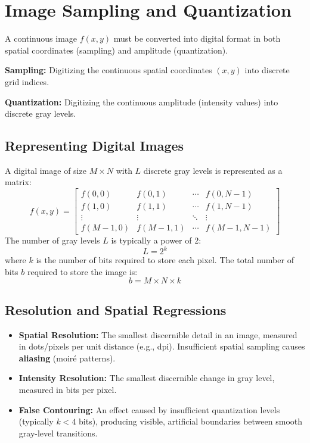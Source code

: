 \documentclass[12pt,a4paper]{article}
\begin{document}
\section{Image Sampling and Quantization}

A continuous image $f(x,y)$ must be converted into digital format in both spatial coordinates (sampling) and amplitude (quantization).

\begin{tcolorbox}[defbox, title={Sampling vs. Quantization}]
\textbf{Sampling:} Digitizing the continuous spatial coordinates $(x,y)$ into discrete grid indices.
\par\noindent
\textbf{Quantization:} Digitizing the continuous amplitude (intensity values) into discrete gray levels.
\end{tcolorbox}

\subsection{Representing Digital Images}
A digital image of size $M \times N$ with $L$ discrete gray levels is represented as a matrix:
\begin{equation}
  f(x,y) = \begin{bmatrix}
    f(0,0) & f(0,1) & \cdots & f(0,N-1) \\
    f(1,0) & f(1,1) & \cdots & f(1,N-1) \\
    \vdots & \vdots & \ddots & \vdots \\
    f(M-1,0) & f(M-1,1) & \cdots & f(M-1,N-1)
  \end{bmatrix}
\end{equation}
The number of gray levels $L$ is typically a power of 2:
\begin{equation}
  L = 2^k
\end{equation}
where $k$ is the number of bits required to store each pixel. The total number of bits $b$ required to store the image is:
\begin{equation}
  b = M \times N \times k
\end{equation}

\subsection{Resolution and Spatial Regressions}
\begin{itemize}[leftmargin=*, itemsep=3.5pt]
  \item \textbf{Spatial Resolution:} The smallest discernible detail in an image, measured in dots/pixels per unit distance (e.g., dpi). Insufficient spatial sampling causes \textbf{aliasing} (moir\'{e} patterns).
  \item \textbf{Intensity Resolution:} The smallest discernible change in gray level, measured in bits per pixel.
  \item \textbf{False Contouring:} An effect caused by insufficient quantization levels (typically $k < 4$ bits), producing visible, artificial boundaries between smooth gray-level transitions.
\end{itemize}
\end{document}
